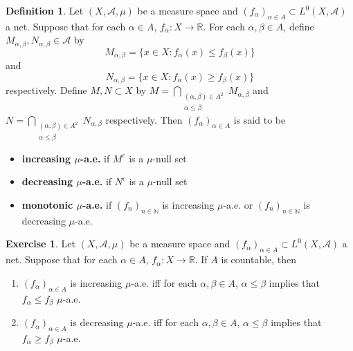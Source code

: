 \documentclass{book}
\theoremstyle{definition}
\newtheorem{defn}[definition]{Definition}
\newtheorem{ex}[definition]{Exercise}
\newcommand{\al}{\alpha}
\newcommand{\be}{\beta}
\newcommand{\N}{\mathbb{N}}
\newcommand{\R}{\mathbb{R}}
\newcommand{\MA}{\mathcal{A}}
\DeclareMathOperator*{\0}{\mbf{0}}
\DeclareMathOperator*{\1}{\mbf{1}}
\begin{document}
	\begin{defn}
		Let $(X, \MA, \mu)$ be a measure space and $(f_\al)_{\al \in A} \subset L^0(X, \MA)$ a net. Suppose that for each $\al \in A$, $f_{\al}:X \rightarrow \R$. For each $\al, \be \in A$, define $M_{\al, \be}, N_{\al, \be} \in \MA$ by
		$$M_{\al, \be} = \{x \in X: f_{\al}(x) \leq f_{\be}(x) \}$$ 
		and 
		$$N_{\al, \be} = \{x \in X: f_{\al}(x) \geq f_{\be}(x) \}$$
		respectively. Define $M,N \subset X$ by $M = \bigcap\limits_{\substack{(\al, \be) \in A^2 \\ \al \leq \be}} M_{\al, \be}$ and $N = \bigcap\limits_{\substack{(\al, \be) \in A^2 \\ \al \leq \be}} N_{\al, \be}$ respectively. Then $(f_{\al})_{\al \in A}$ is said to be 
		\begin{itemize}
			\item \textbf{increasing $\mu$-a.e.} if $M^c$ is a $\mu$-null set
			\item \textbf{decreasing $\mu$-a.e.} if $N^c$ is a $\mu$-null set
			\item \textbf{monotonic $\mu$-a.e.} if $(f_n)_{n \in \N}$ is increasing $\mu$-a.e. or $(f_n)_{n \in \N}$ is decreasing $\mu$-a.e.
		\end{itemize} 
	\end{defn}

	\begin{ex}
		Let $(X, \MA, \mu)$ be a measure space and $(f_\al)_{\al \in A} \subset L^0(X, \MA)$ a net. Suppose that for each $\al \in A$, $f_{\al}:X \rightarrow \R$. If $A$ is countable, then 
		\begin{enumerate}
			\item $(f_\al)_{\al \in A}$ is increasing $\mu$-a.e. iff for each $\al, \be \in A$, $\al \leq \be$ implies that $f_{\al} \leq f_{\be}$ $\mu$-a.e.
			\item $(f_\al)_{\al \in A}$ is decreasing $\mu$-a.e. iff for each $\al, \be \in A$, $\al \leq \be$ implies that $f_{\al} \geq f_{\be}$ $\mu$-a.e.
		\end{enumerate}
	\end{ex}
\end{document}
